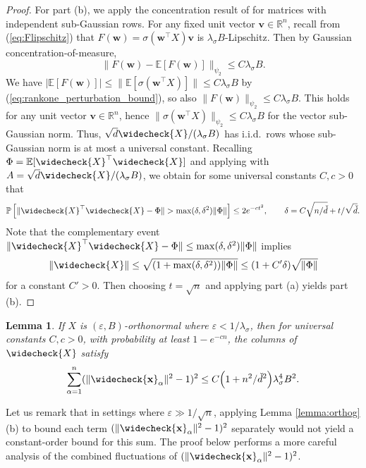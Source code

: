 \documentclass{article}
\newtheorem{lemma}[theorem]{Lemma}
\theoremstyle{definition}
\newcommand{\R}{\mathbb{R}}
\newcommand{\E}{\mathbb{E}}
\renewcommand{\v}{\mathbf{v}}
\newcommand{\w}{\mathbf{w}}
\renewcommand{\a}{\alpha}
\newcommand{\eps}{\varepsilon}
\newcommand{\vd}{\check{d}}
\newcommand{\vX}{\widecheck{X}}
\renewcommand{\P}{\mathbb{P}}
\newcommand{\vx}{\widecheck{\mathbf{x}}}
\newcommand{\1}{\mathbf{1}}
\begin{document}
\begin{proof}
For part (b), we apply the concentration result of
\cite[Eq.\ (5.26)]{vershynin2010introduction} for matrices with independent
sub-Gaussian rows. For any fixed unit vector $\v \in \R^n$, recall from
(\ref{eq:Flipschitz}) that $F(\w)=\sigma(\w^\top X)\v$ is $\lambda_\sigma
B$-Lipschitz. Then by Gaussian concentration-of-measure,
\[\|F(\w)-\E[F(\w)]\|_{\psi_2} \leq C\lambda_\sigma B.\]
We have $|\E[F(\w)]| \leq \|\E[\sigma(\w^\top X)]\| \leq C\lambda_\sigma B$ by
(\ref{eq:rankone_perturbation_bound}), so also
$\|F(\w)\|_{\psi_2} \leq C\lambda_\sigma B$.
This holds for any unit vector $\v \in \R^n$, hence
$\|\sigma(\w^\top X)\|_{\psi_2} \leq C\lambda_\sigma B$ for the vector
sub-Gaussian norm. Thus, $\sqrt{d}\vX/(\lambda_\sigma B)$ has i.i.d.\
rows whose sub-Gaussian norm is at most a universal constant. Recalling
$\Phi=\E[\vX^\top \vX]$ and applying
\cite[Eq.\ (5.26)]{vershynin2010introduction} with
$A=\sqrt{d}\vX/(\lambda_\sigma B)$, we obtain for some universal
constants $C,c>0$ that
\[\P\left[\|\vX^\top \vX-\Phi\|>
\max(\delta,\delta^2)\|\Phi\|\right] \leq 2e^{-ct^2},
\qquad \delta=C\sqrt{n/\vd}+t/\sqrt{\vd}.\]
Note that the complementary event $\|\vX^\top \vX-\Phi\|
\leq \max(\delta,\delta^2)\|\Phi\|$ implies
\[\|\vX\| \leq \sqrt{(1+\max(\delta,\delta^2))\|\Phi\|}
\leq (1+C'\delta)\sqrt{\|\Phi\|}\]
for a constant $C'>0$. Then choosing $t=\sqrt{n}$ and applying part (a) yields
part (b).
\end{proof}

\begin{lemma}\label{lemma:colsqbound}
If $X$ is $(\eps,B)$-orthonormal where $\eps<1/\lambda_\sigma$,
then for universal constants $C,c>0$,
with probability at least $1-e^{-cn}$, the columns of $\vX$ satisfy
\[\sum_{\a=1}^n (\|\vx_\a\|^2-1)^2 \leq C\Big(1+n^2/\vd^2\Big)\lambda_\sigma^4
B^2.\]
\end{lemma}

Let us remark that in settings where $\eps \gg 1/\sqrt{n}$, applying
Lemma \ref{lemma:orthog}(b) to bound each term $(\|\vx_\a\|^2-1)^2$ separately
would not yield a constant-order bound for this sum. The proof below performs
a more careful analysis of the combined fluctuations of $(\|\vx_\a\|^2-1)^2$.
\end{document}
